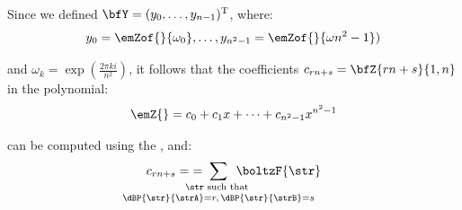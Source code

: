 \documentclass{beamer}
\begin{document}
\begin{frame}
	Since we defined $\bfY = (y_0,\dots,y_{n-1})^{\text T}$, where:
	\begin{align*}
		y_0=\emZof{}{\omega_0},\dots,y_{n^2-1}=\emZof{}{\omega{n^2-1}})
	\end{align*}

	and $\omega_k = \exp(\frac{2\pi ki}{n^2})$, it follows that the coefficients $c_{rn+s}=\bfZ{rn+s}{1,n}$ in the polynomial:
	\begin{align*}
		\emZ{} = c_0 + c_1 x + \dots + c_{n^2-1} x^{n^2-1}
	\end{align*}

	can be computed using the \fft, and:
	\begin{align*}
		c_{rn+s}=\;=\; \sum_{\mathclap{\substack{ \str \text{ such that } \rule[-.5ex]{0pt}{0pt} \\
		\dBP{\str}{\strA} = r,\,\dBP{\str}{\strB} = s}}}\enspace \boltzF{\str}
	\end{align*}
\end{frame}
\end{document}
